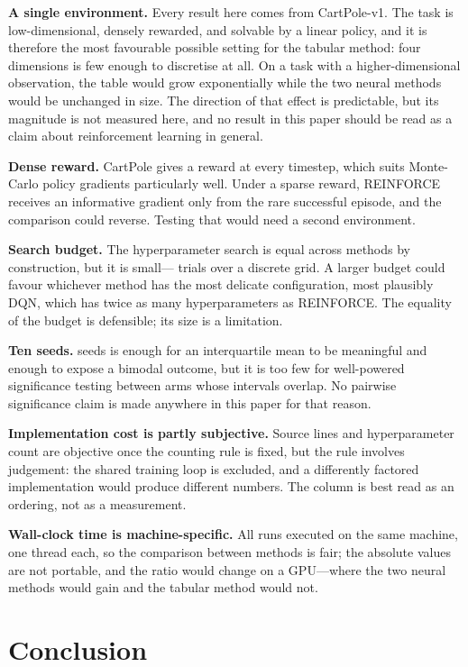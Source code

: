 \documentclass[conference]{IEEEtran}
\begin{document}
\textbf{A single environment.} Every result here comes from CartPole-v1. The task
is low-dimensional, densely rewarded, and solvable by a linear policy, and it is
therefore the most favourable possible setting for the tabular method: four
dimensions is few enough to discretise at all. On a task with a higher-dimensional
observation, the table would grow exponentially while the two neural methods would
be unchanged in size. The direction of that effect is predictable, but its
magnitude is not measured here, and no result in this paper should be read as a
claim about reinforcement learning in general.

\textbf{Dense reward.} CartPole gives a reward at every timestep, which suits
Monte-Carlo policy gradients particularly well. Under a sparse reward, REINFORCE
receives an informative gradient only from the rare successful episode, and the
comparison could reverse. Testing that would need a second environment.

\textbf{Search budget.} The hyperparameter search is equal across methods by
construction, but it is small---\NumTrials{} trials over a discrete grid. A larger
budget could favour whichever method has the most delicate configuration, most
plausibly DQN, which has twice as many hyperparameters as REINFORCE. The equality
of the budget is defensible; its size is a limitation.

\textbf{Ten seeds.} \NumSeeds{} seeds is enough for an interquartile mean to be
meaningful and enough to expose a bimodal outcome, but it is too few for
well-powered significance testing between arms whose intervals overlap. No
pairwise significance claim is made anywhere in this paper for that reason.

\textbf{Implementation cost is partly subjective.} Source lines and hyperparameter
count are objective once the counting rule is fixed, but the rule involves
judgement: the shared training loop is excluded, and a differently factored
implementation would produce different numbers. The column is best read as an
ordering, not as a measurement.

\textbf{Wall-clock time is machine-specific.} All runs executed on the same
machine, one thread each, so the comparison between methods is fair; the absolute
values are not portable, and the ratio would change on a GPU---where the two
neural methods would gain and the tabular method would not.

\section{Conclusion}
\end{document}
